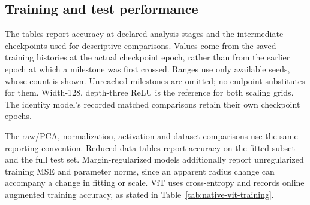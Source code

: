 
\FloatBarrier

\subsection{Training and test performance}
\label{app:performance}
The tables report accuracy at declared analysis stages and the intermediate checkpoints used for descriptive comparisons. Values come from the saved training histories at the actual checkpoint epoch, rather than from the earlier epoch at which a milestone was first crossed. Ranges use only available seeds, whose count is shown. Unreached milestones are omitted; no endpoint substitutes for them. Width-128, depth-three ReLU is the reference for both scaling grids. The identity model's recorded matched comparisons retain their own checkpoint epochs.

The raw/PCA, normalization, activation and dataset comparisons use the same reporting convention. Reduced-data tables report accuracy on the fitted subset and the full test set. Margin-regularized models additionally report unregularized training MSE and parameter norms, since an apparent radius change can accompany a change in fitting or scale. ViT uses cross-entropy and records online augmented training accuracy, as stated in Table~\ref{tab:native-vit-training}.


